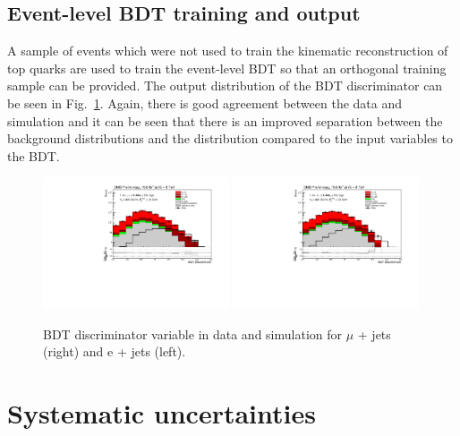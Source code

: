 \subsection{Event-level BDT training and output}
A sample of events which were not used to train the kinematic reconstruction of top quarks are used to train the event-level BDT so that an orthogonal training sample can be provided. 
The output distribution of the BDT discriminator can be seen in Fig.~\ref{fig:BDT}. Again, there is good agreement between the data and simulation and it can be seen that there is an improved separation between the background distributions and the \tttt distribution compared to the input variables to the BDT.

\begin{figure}[!ht]
    \includegraphics[width=0.49\textwidth]{images/Run1/figures/MVA_Mu.pdf}
    \includegraphics[width=0.49\textwidth]{images/Run1/figures/MVA_e.pdf}
    \caption{BDT discriminator variable in data and simulation for $\mu$ + jets (right) and e + jets (left).}
    \label{fig:BDT}
\end{figure}

\section{Systematic uncertainties}
\label{sec:uncertainties8}

